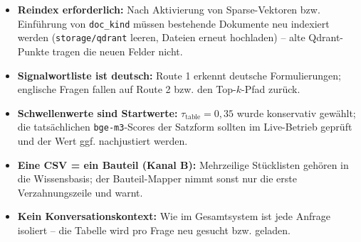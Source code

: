 \documentclass[12pt, a4paper]{article}
\begin{document}
\begin{itemize}[itemsep=2pt]
  \item \textbf{Reindex erforderlich:} Nach Aktivierung von Sparse-Vektoren
        bzw. Einführung von \texttt{doc\_kind} müssen bestehende Dokumente neu
        indexiert werden (\texttt{storage/qdrant} leeren, Dateien erneut
        hochladen) -- alte Qdrant-Punkte tragen die neuen Felder nicht.
  \item \textbf{Signalwortliste ist deutsch:} Route 1 erkennt deutsche
        Formulierungen; englische Fragen fallen auf Route 2 bzw. den
        Top-$k$-Pfad zurück.
  \item \textbf{Schwellenwerte sind Startwerte:} $\tau_{\text{table}} = 0{,}35$
        wurde konservativ gewählt; die tatsächlichen \texttt{bge-m3}-Scores der
        Satzform sollten im Live-Betrieb geprüft und der Wert ggf. nachjustiert
        werden.
  \item \textbf{Eine CSV = ein Bauteil (Kanal B):} Mehrzeilige Stücklisten
        gehören in die Wissensbasis; der Bauteil-Mapper nimmt sonst nur die
        erste Verzahnungszeile und warnt.
  \item \textbf{Kein Konversationskontext:} Wie im Gesamtsystem ist jede
        Anfrage isoliert -- die Tabelle wird pro Frage neu gesucht bzw.
        geladen.
\end{itemize}
\end{document}
